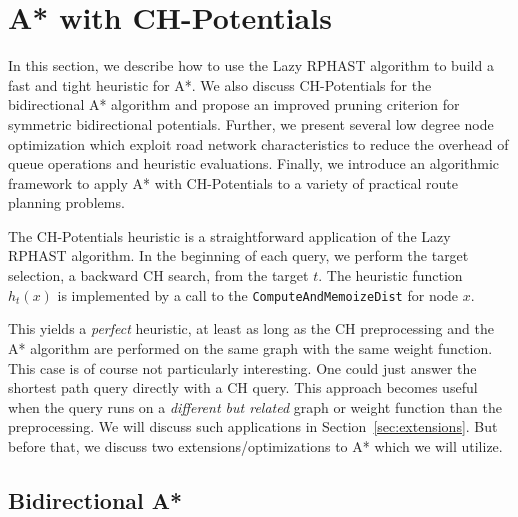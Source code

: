 \documentclass[manuscript,review]{acmart}
\begin{document}
\section{A* with CH-Potentials}\label{sec:main-algo}

In this section, we describe how to use the Lazy RPHAST algorithm to build a fast and tight heuristic for A*.
We also discuss CH-Potentials for the bidirectional A* algorithm and propose an improved pruning criterion for symmetric bidirectional potentials.
Further, we present several low degree node optimization which exploit road network characteristics to reduce the overhead of queue operations and heuristic evaluations.
Finally, we introduce an algorithmic framework to apply A* with CH-Potentials to a variety of practical route planning problems.

The CH-Potentials heuristic is a straightforward application of the Lazy RPHAST algorithm.
In the beginning of each query, we perform the target selection, a backward CH search, from the target $t$.
The heuristic function $h_t(x)$ is implemented by a call to the \texttt{ComputeAndMemoizeDist} for node $x$.

This yields a \emph{perfect} heuristic, at least as long as the CH preprocessing and the A* algorithm are performed on the same graph with the same weight function.
This case is of course not particularly interesting.
One could just answer the shortest path query directly with a CH query.
This approach becomes useful when the query runs on a \emph{different but related} graph or weight function than the preprocessing.
We will discuss such applications in Section~\ref{sec:extensions}.
But before that, we discuss two extensions/optimizations to A* which we will utilize.

\subsection{Bidirectional A*}
\end{document}
